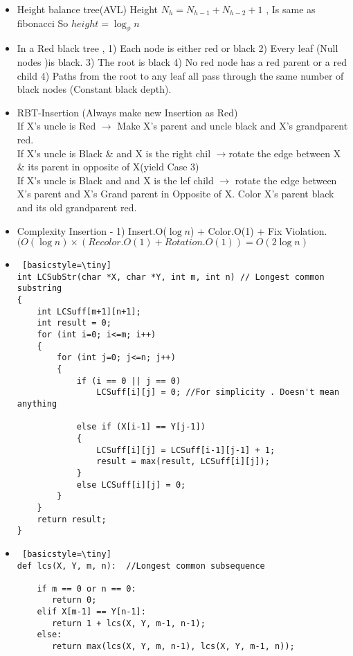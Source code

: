 \documentclass[0.5pt]{report}
\begin{document}
\noindent
\begin{itemize}
\setlength\itemsep{-.5em}
\item Height balance tree(AVL) Height $N_h = N_{h-1} + N_{h-2} + 1 $ , Is same as fibonacci So $ height = \log_\phi n $
\item In a Red black tree , 1) Each node is either red or black 2) Every leaf (Null nodes )is black. 3) The root is black 4) No red node has a red parent or a red child 4) Paths from the root to any leaf all pass through the same number of black nodes (Constant black depth).
\item RBT-Insertion (Always make new Insertion as Red)
~~\\If X's uncle is Red $\rightarrow $ Make X's parent and uncle black and X's grandparent red.  
~~\\If X's uncle is Black \& and X is the right chil $\rightarrow$rotate the edge between X \& its parent in opposite of X(yield Case 3)
~~\\ If X's uncle is Black and and X is the lef child $ \rightarrow$ rotate the edge between X's parent and X's Grand parent in Opposite of X. Color X's parent black and its old grandparent red.
\item Complexity Insertion - 1) Insert.O($\log n$) + Color.O(1) + Fix Violation.$(O(\log n) \times ( Recolor.O(1) + Rotation.O(1)) = O(2 \log n)$  
\item 
\begin{lstlisting} [basicstyle=\tiny]  
int LCSubStr(char *X, char *Y, int m, int n) // Longest common substring
{
    int LCSuff[m+1][n+1];
    int result = 0; 
    for (int i=0; i<=m; i++)
    {
        for (int j=0; j<=n; j++)
        {
            if (i == 0 || j == 0)
                LCSuff[i][j] = 0; //For simplicity . Doesn't mean anything
 
            else if (X[i-1] == Y[j-1])
            {
                LCSuff[i][j] = LCSuff[i-1][j-1] + 1;
                result = max(result, LCSuff[i][j]);
            }
            else LCSuff[i][j] = 0;
        }
    }
    return result;
}
\end{lstlisting}

\item
\begin{lstlisting} [basicstyle=\tiny]  
def lcs(X, Y, m, n):  //Longest common subsequence
 
    if m == 0 or n == 0:
       return 0;
    elif X[m-1] == Y[n-1]:
       return 1 + lcs(X, Y, m-1, n-1);
    else:
       return max(lcs(X, Y, m, n-1), lcs(X, Y, m-1, n));
\end{lstlisting}


\end{itemize}
\end{document}

